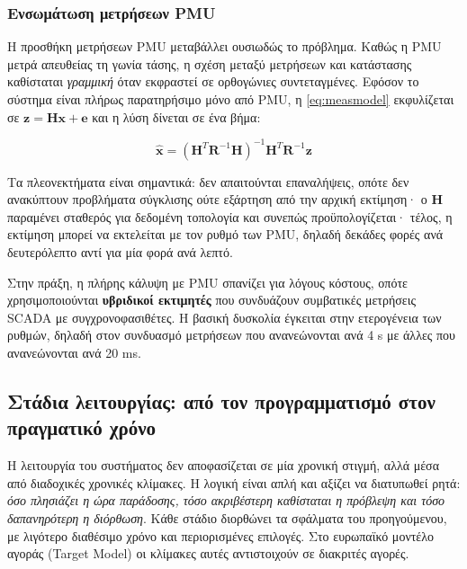 \subsubsection*{Ενσωμάτωση μετρήσεων PMU}

Η προσθήκη μετρήσεων PMU μεταβάλλει ουσιωδώς το πρόβλημα. Καθώς η PMU μετρά απευθείας τη
γωνία τάσης, η σχέση μεταξύ μετρήσεων και κατάστασης καθίσταται \emph{γραμμική} όταν
εκφραστεί σε ορθογώνιες συντεταγμένες. Εφόσον το σύστημα είναι πλήρως παρατηρήσιμο μόνο
από PMU, η \eqref{eq:measmodel} εκφυλίζεται σε
$\mathbf{z} = \mathbf{H}\mathbf{x} + \mathbf{e}$ και η λύση δίνεται σε ένα βήμα:

\begin{equation}
\hat{\mathbf{x}} = \left(\mathbf{H}^{T}\mathbf{R}^{-1}\mathbf{H}\right)^{-1}
                    \mathbf{H}^{T}\mathbf{R}^{-1}\mathbf{z}
\label{eq:linse}
\end{equation}

Τα πλεονεκτήματα είναι σημαντικά: δεν απαιτούνται επαναλήψεις, οπότε δεν ανακύπτουν
προβλήματα σύγκλισης ούτε εξάρτηση από την αρχική εκτίμηση· ο $\mathbf{H}$ παραμένει
σταθερός για δεδομένη τοπολογία και συνεπώς προϋπολογίζεται· τέλος, η εκτίμηση μπορεί να
εκτελείται με τον ρυθμό των PMU, δηλαδή δεκάδες φορές ανά δευτερόλεπτο αντί για μία φορά
ανά λεπτό.

Στην πράξη, η πλήρης κάλυψη με PMU σπανίζει για λόγους κόστους, οπότε χρησιμοποιούνται
\textbf{υβριδικοί εκτιμητές} που συνδυάζουν συμβατικές μετρήσεις SCADA με
συγχρονοφασιθέτες. Η βασική δυσκολία έγκειται στην ετερογένεια των ρυθμών, δηλαδή στον
συνδυασμό μετρήσεων που ανανεώνονται ανά 4 s με άλλες που ανανεώνονται ανά 20 ms.

\subsection{Στάδια λειτουργίας: από τον προγραμματισμό στον πραγματικό χρόνο}

Η λειτουργία του συστήματος δεν αποφασίζεται σε μία χρονική στιγμή, αλλά μέσα από
διαδοχικές χρονικές κλίμακες. Η λογική είναι απλή και αξίζει να διατυπωθεί ρητά: \emph{όσο
πλησιάζει η ώρα παράδοσης, τόσο ακριβέστερη καθίσταται η πρόβλεψη και τόσο δαπανηρότερη η
διόρθωση}. Κάθε στάδιο διορθώνει τα σφάλματα του προηγούμενου, με λιγότερο διαθέσιμο χρόνο
και περιορισμένες επιλογές. Στο ευρωπαϊκό μοντέλο αγοράς (Target Model) οι κλίμακες αυτές
αντιστοιχούν σε διακριτές αγορές.

